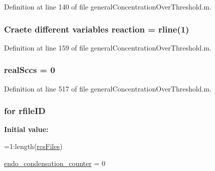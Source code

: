 Definition at line 140 of file general\-Concentration\-Over\-Threshold.\-m.

\hypertarget{a00022_a4ba2ecb46f808729569ecce2cc1d34c6}{
\subsubsection[{reaction}]{\setlength{\rightskip}{0pt plus 5cm}Craete different {\bf variables} reaction = {\bf rline}(1)}}\label{a00022_a4ba2ecb46f808729569ecce2cc1d34c6}


Definition at line 159 of file general\-Concentration\-Over\-Threshold.\-m.

\hypertarget{a00022_a135a83e607075aa815c72f1ec0cbbc5a}{
\subsubsection[{real\-Sccs}]{\setlength{\rightskip}{0pt plus 5cm}real\-Sccs = 0}}\label{a00022_a135a83e607075aa815c72f1ec0cbbc5a}


Definition at line 517 of file general\-Concentration\-Over\-Threshold.\-m.

\hypertarget{a00022_a2773ef160060ce8adead229154219112}{
\subsubsection[{rfile\-I\-D}]{\setlength{\rightskip}{0pt plus 5cm}for rfile\-I\-D}}\label{a00022_a2773ef160060ce8adead229154219112}
{\bfseries Initial value\-:}
\begin{DoxyCode}
=1:length(\hyperlink{a00022_aa7a414dad4901fc05688608a49adfd7e}{rcsFiles})
            
            \hyperlink{a00022_ac7610da79e174cac91899b5a15014265}{endo\_condensation\_counter} = 0
\end{DoxyCode}


